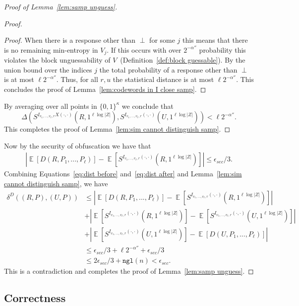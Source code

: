\documentclass[11pt]{article}
\newcommand{\defref}[1]{\mbox{Definition~\ref{#1}}}
\newcommand{\lemref}[1]{\mbox{Lemma~\ref{#1}}}
\DeclareMathOperator*{\expe}{\mathbb{E}}
\newcommand{\zo}{\ensuremath{\{0, 1\}}}
\newcommand{\ngl}{\ensuremath{\mathtt{ngl}}\xspace}
\begin{document}
\begin{proof}[{\large Proof of \lemref{lem:samp unguess}}]
\begin{proof}
\begin{proof}
 When there is a response other than $\perp$ for some $j$ this means that there is no remaining min-entropy in $V_j$.  If this occurs with over $2^{-\alpha''}$ probability this violates the block unguessability of $V$~(\defref{def:block guessable}).  By the union bound over the indices $j$ the total probability of a response other than $\perp$ is at most $\ell 2^{-\alpha''}$. Thus, for all $r, u$ the statistical distance is at most $\ell 2^{-\alpha''}$.  This concludes the proof of \lemref{lem:codewords in I close samp}.
\end{proof}
By averaging over all points in $\zo^\kappa$ we conclude that
\[\Delta(S^{I_{v_1, ..., v_\ell, r}X(\cdot, \cdot)}(R, 1^{\ell \log |Z|}), S^{I_{v_1, ..., v_\ell, r}(\cdot, \cdot)}(U, 1^{\ell \log |Z|})) < \ell 2^{-\alpha''}.\]  This completes the proof of \lemref{lem:sim cannot distinguish samp}.
\end{proof}

\noindent Now by the security of obfuscation we have that
\begin{align}
\label{eq:dist after}
|\expe [D(R, P_1,..., P_\ell) ]- \expe [S^{I_{v_1, ..., v_\ell, r}(\cdot, \cdot)}(R, 1^{\ell \log |Z|})] |\leq \epsilon_{sec}/3.
\end{align}
Combining Equations~\ref{eq:dist before} and~\ref{eq:dist after} and \lemref{lem:sim cannot distinguish samp}, we have
\begin{align*}
\delta^{D}((R, P), (U, P))&\leq |\expe [D(R, P_1,..., P_\ell)] - \expe [S^{I_{v_1, ..., v_\ell, r}(\cdot, \cdot)}(R, 1^{\ell \log |Z|})]| \\
&+|\expe[S^{I_{v_1, ..., v_\ell, r}(\cdot, \cdot)}(R, 1^{\ell \log |Z|})] - \expe[S^{I_{v_1, ..., v_\ell, r}(\cdot, \cdot)}(U, 1^{\ell \log |Z|})] |\\
&+|\expe [S^{I_{v_1, ..., v_\ell, r}(\cdot, \cdot)}(U, 1^{\ell \log |Z|})] - \expe [D(U, P_1,..., P_\ell) ]|\\
&\leq \epsilon_{sec}/3+ \ell 2^{-\alpha''}+\epsilon_{sec}/3 \\
&\leq 2\epsilon_{sec}/3 + \ngl(n) < \epsilon_{sec}.
\end{align*}
This is a contradiction and completes the proof of \lemref{lem:samp unguess}.
\end{proof}

\subsection{Correctness}
\label{sec:sampling errors}
\end{document}
